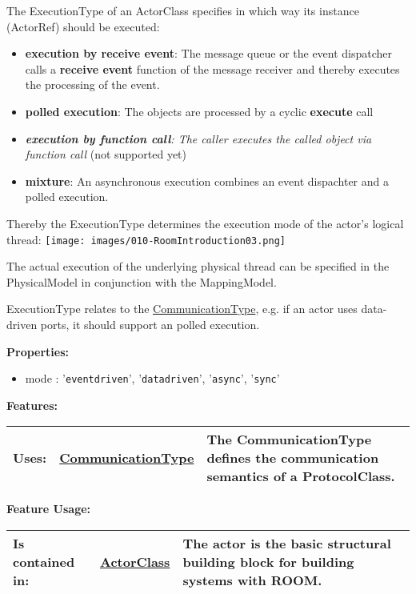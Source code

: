 		The ExecutionType of an ActorClass specifies in which way its instance (ActorRef) should be executed:
		\begin{itemize}
		\item \textbf{execution by receive event}: The message queue or the event dispatcher calls a 
		\textbf{receive event} function of the message receiver and thereby executes the processing of the event.
		\item \textbf{polled execution}: The objects are processed by a cyclic \textbf{execute} call
		\item \textit{\textbf{execution by function call}: The caller executes the called object via function call} (not supported yet)
		\item \textbf{mixture}: An asynchronous execution combines an event dispachter and a polled execution.
		\end{itemize}
		
		Thereby the ExecutionType determines the execution mode of the actor's logical thread:
		\texttt{[image: images/010-RoomIntroduction03.png]}
				
		The actual execution of the underlying physical thread can be specified in the PhysicalModel in conjunction with the MappingModel.
		
		ExecutionType relates to the \hyperlink{ref:CommunicationType}{CommunicationType}, e.g. if an actor uses data-driven ports, it should support an polled execution.
		
		\textbf{Properties:}
		\begin{itemize}
		\item mode : '\verb|eventdriven|', '\verb|datadriven|', '\verb|async|', '\verb|sync|'
		\end{itemize}
		
		\begingroup
		\textbf{Features:}
		\renewcommand{\arraystretch}{1.8} %
		\begin{longtable}{l|l p{}}
			\hline
		Uses: & \tabitem \hyperlink{ref:CommunicationType}{CommunicationType}  & The CommunicationType defines the communication semantics of a ProtocolClass.\\
		\hline
		\end{longtable}
		\endgroup
		
		\begingroup
		\textbf{Feature Usage:}
		\renewcommand{\arraystretch}{1.8} %
		\begin{longtable}{l|l p{}}
			\hline
		Is contained in: & \tabitem \hyperlink{ref:ActorClass}{ActorClass}  & The actor is the basic structural building block for building systems with ROOM.\\
		\hline
		\end{longtable}
		\endgroup
		
